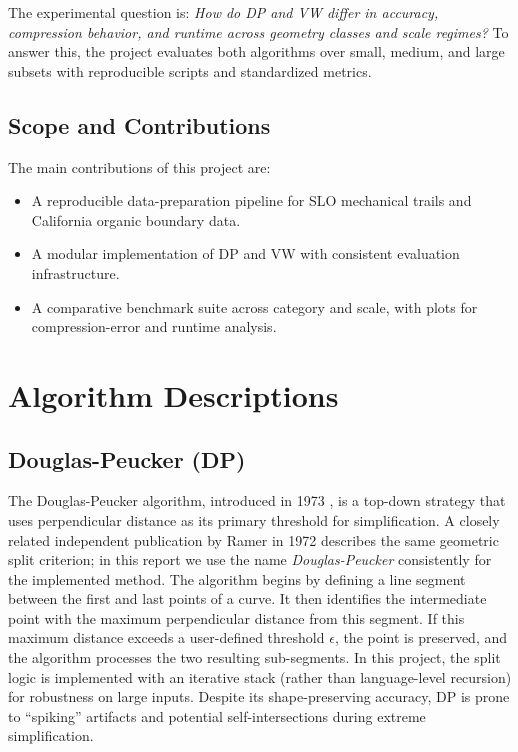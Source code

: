 \documentclass[12pt]{article}
\begin{document}
The experimental question is: \emph{How do DP and VW differ in accuracy, compression behavior, and runtime across geometry classes and scale regimes?}  
To answer this, the project evaluates both algorithms over small, medium, and large subsets with reproducible scripts and standardized metrics.

\subsection{Scope and Contributions}
The main contributions of this project are:
\begin{itemize}
    \item A reproducible data-preparation pipeline for SLO mechanical trails and California organic boundary data.
    \item A modular implementation of DP and VW with consistent evaluation infrastructure.
    \item A comparative benchmark suite across category and scale, with plots for compression-error and runtime analysis.
\end{itemize}

\section{Algorithm Descriptions}

\subsection{Douglas-Peucker (DP)}
The Douglas-Peucker algorithm, introduced in 1973 \cite{dp1973}, is a top-down strategy that uses perpendicular distance as its primary threshold for simplification. A closely related independent publication by Ramer in 1972 \cite{ramer1972} describes the same geometric split criterion; in this report we use the name \emph{Douglas-Peucker} consistently for the implemented method. The algorithm begins by defining a line segment between the first and last points of a curve. It then identifies the intermediate point with the maximum perpendicular distance from this segment. If this maximum distance exceeds a user-defined threshold $\epsilon$, the point is preserved, and the algorithm processes the two resulting sub-segments. In this project, the split logic is implemented with an iterative stack (rather than language-level recursion) for robustness on large inputs. Despite its shape-preserving accuracy, DP is prone to ``spiking'' artifacts and potential self-intersections during extreme simplification.
\end{document}

